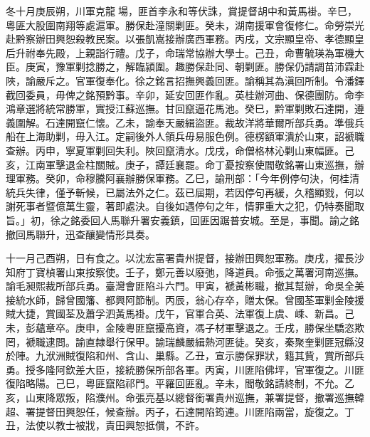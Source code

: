 \begin{pinyinscope}
冬十月庚辰朔，川軍克龍場，匪首李永和等伏誅，賞提督胡中和黃馬褂。辛巳，粵匪大股圍南翔等處滬軍。勝保赴潼關剿匪。癸未，湖南援軍會復修仁。命勞崇光赴黔察辦田興恕殺教民案。以張凱嵩接辦廣西軍務。丙戌，文宗顯皇帝、孝德顯皇后升祔奉先殿，上親詣行禮。戊子，命瑞常協辦大學士。己丑，命曹毓瑛為軍機大臣。庚寅，豫軍剿捻勝之，解臨潁圍。趣勝保赴同、朝剿匪。勝保仍請調苗沛霖赴陜，諭嚴斥之。官軍復奉化。徐之銘言招撫興義回匪。諭稱其為滇回所制。令潘鐸截回委員，毋俾之銘預黔事。辛卯，延安回匪作亂。英桂辦河曲、保德團防。命李鴻章選將統常勝軍，實授江蘇巡撫。甘回竄逼花馬池。癸巳，黔軍剿敗石達開，遵義圍解。石達開竄仁懷。乙未，諭奉天嚴緝盜匪。裁故洋將華爾所部兵勇。準俄兵船在上海助剿，毋入江。定嗣後外人領兵毋易服色例。德楞額軍潰於山東，詔褫職查辦。丙申，寧夏軍剿回失利。陜回竄清水。戊戌，命僧格林沁剿山東幅匪。己亥，江南軍擊退金柱關賊。庚子，譚廷襄罷。命丁憂按察使閻敬銘署山東巡撫，辦理軍務。癸卯，命穆騰阿襄辦勝保軍務。乙巳，諭刑部：「今年例停句決，何桂清統兵失律，僅予斬候，已屬法外之仁。茲已屆期，若因停句再緩，久稽顯戮，何以謝死事者暨億萬生靈，著即處決。自後如遇停句之年，情罪重大之犯，仍特奏聞取旨。」初，徐之銘委回人馬聯升署安義鎮，回匪因踞普安城。至是，事聞。諭之銘撤回馬聯升，迅查釀變情形具奏。

十一月己酉朔，日有食之。以沈宏富署貴州提督，接辦田興恕軍務。庚戌，擢長沙知府丁寶楨署山東按察使。壬子，鄭元善以廢弛，降道員。命張之萬署河南巡撫。諭毛昶熙裁所部兵勇。臺灣會匪陷斗六門。甲寅，褫黃彬職，撤其幫辦，命吳全美接統水師，歸曾國籓、都興阿節制。丙辰，翁心存卒，贈太保。曾國荃軍剿金陵援賊大捷，賞國荃及蕭孚泗黃馬褂。戊午，官軍合英、法軍復上虞、嵊、新昌。己未，彭蘊章卒。庚申，金陵粵匪竄擾高資，馮子材軍擊退之。壬戌，勝保坐驕恣欺罔，褫職逮問。諭直隸舉行保甲。諭瑞麟嚴緝熱河匪徒。癸亥，秦聚奎剿匪冠縣沒於陣。九洑洲賊復陷和州、含山、巢縣。乙丑，宣示勝保罪狀，籍其貲，賞所部兵勇。授多隆阿欽差大臣，接統勝保所部各軍。丙寅，川匪陷佛坪，官軍復之。川匪復陷略陽。己巳，粵匪竄陷祁門。平羅回匪亂。辛未，閻敬銘請終制，不允。乙亥，山東降眾叛，陷濮州。命張亮基以總督銜署貴州巡撫，兼署提督，撤署巡撫韓超、署提督田興恕任，候查辦。丙子，石達開陷筠連。川匪陷兩當，旋復之。丁丑，法使以教士被戕，責田興恕抵償，不許。


\end{pinyinscope}
